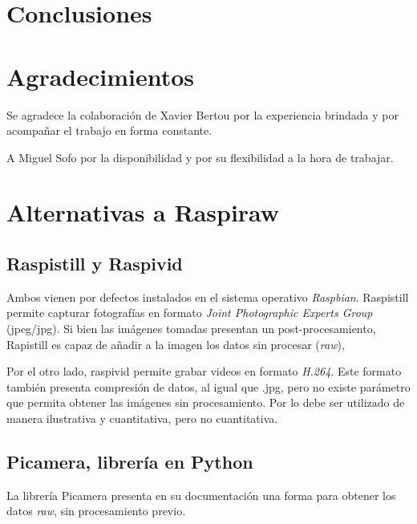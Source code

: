 \documentclass[twoside,twocolumn]{article}
\begin{document}
  \section{Conclusiones}


  
  

  \section*{Agradecimientos}
    Se agradece la colaboración de Xavier Bertou por la experiencia brindada y por
    acompañar el trabajo en forma constante.

    A Miguel Sofo por la disponibilidad y por su flexibilidad a la hora de trabajar.
   
  \clearpage
  \appendix
  \section{Alternativas a Raspiraw}\label{sec:ap_alternatives}
  
  \subsection{Raspistill y Raspivid}
    Ambos vienen por defectos instalados en el sistema operativo \emph{Raspbian}.
    Raspistill permite capturar fotografías en formato \emph{Joint Photographic Experts Group} (jpeg/jpg).
    Si bien las imágenes tomadas presentan un post-procesamiento, Rapistill es capaz de añadir a la imagen los datos sin procesar (\emph{raw}),

    Por el otro lado, raspivid permite grabar videos en formato \emph{H.264}.
    Este formato también presenta compresión de datos, al igual que .jpg, pero no existe parámetro que permita obtener las imágenes sin procesamiento.
    Por lo debe ser utilizado de manera ilustrativa y cuantitativa, pero no cuantitativa.

  \subsection{Picamera, librería en Python}
    La librería Picamera presenta en su documentación una forma para obtener los datos \emph{raw}, sin procesamiento previo.
\end{document}
